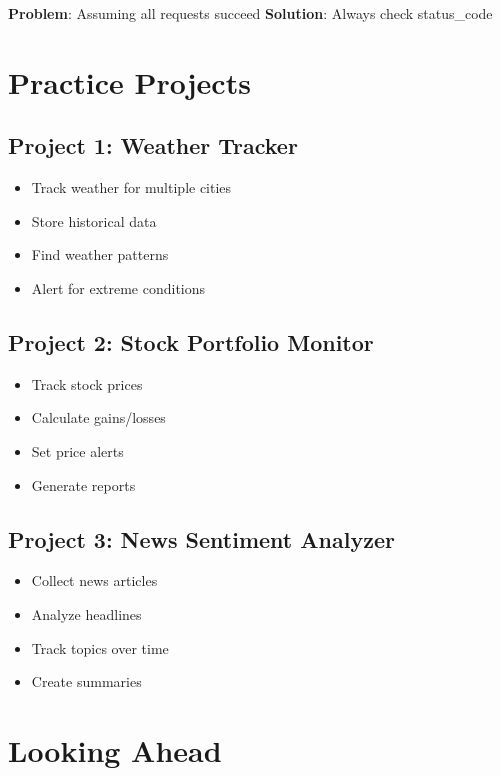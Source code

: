 \documentclass[
  letterpaper,
  DIV=11,
  numbers=noendperiod,
  oneside]{scrreprt}
\providecommand{\tightlist}{%
  \setlength{\itemsep}{0pt}\setlength{\parskip}{0pt}}\usepackage{longtable,booktabs,array}
\begin{document}
\textbf{Problem}: Assuming all requests succeed \textbf{Solution}:
Always check status\_code

\section{Practice Projects}\label{practice-projects-1}

\subsection{Project 1: Weather Tracker}\label{project-1-weather-tracker}

\begin{itemize}
\tightlist
\item
  Track weather for multiple cities
\item
  Store historical data
\item
  Find weather patterns
\item
  Alert for extreme conditions
\end{itemize}

\subsection{Project 2: Stock Portfolio
Monitor}\label{project-2-stock-portfolio-monitor}

\begin{itemize}
\tightlist
\item
  Track stock prices
\item
  Calculate gains/losses
\item
  Set price alerts
\item
  Generate reports
\end{itemize}

\subsection{Project 3: News Sentiment
Analyzer}\label{project-3-news-sentiment-analyzer}

\begin{itemize}
\tightlist
\item
  Collect news articles
\item
  Analyze headlines
\item
  Track topics over time
\item
  Create summaries
\end{itemize}

\section{Looking Ahead}\label{looking-ahead-1}
\end{document}
